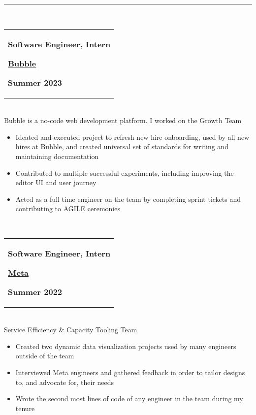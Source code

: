 \documentclass[10pt]{extarticle}
\begin{document}
\rule{\textwidth}{0.4pt}\\ 
\begin{tabular}{@{}p{\textwidth}}\begin{minipage}[t]{0.333\textwidth}
\raggedright
\textbf{Software Engineer, Intern}
\end{minipage}%
\begin{minipage}[t]{0.333\textwidth}
\centering
\textbf{\underline{Bubble}}
\end{minipage}%
\begin{minipage}[t]{0.333\textwidth}
\raggedleft
\textbf{Summer 2023}
\end{minipage}%
\end{tabular}\\[0.5ex]
Bubble is a no-code web development platform. I worked on the Growth Team\\ 
\vspace{-\baselineskip}
\begin{itemize}[noitemsep,nolistsep]
\item Ideated and executed project to refresh new hire onboarding, used by all new hires at Bubble, and created universal set of standards for writing and maintaining documentation
\item Contributed to multiple successful experiments, including improving the editor UI and user journey
\item Acted as a full time engineer on the team by completing sprint tickets and contributing to AGILE ceremonies
\end{itemize}~\\[-1ex]
\begin{tabular}{@{}p{\textwidth}}\begin{minipage}[t]{0.333\textwidth}
\raggedright
\textbf{Software Engineer, Intern}
\end{minipage}%
\begin{minipage}[t]{0.333\textwidth}
\centering
\textbf{\underline{Meta}}
\end{minipage}%
\begin{minipage}[t]{0.333\textwidth}
\raggedleft
\textbf{Summer 2022}
\end{minipage}%
\end{tabular}\\[0.5ex]
Service Efficiency \& Capacity Tooling Team\\ 
\vspace{-\baselineskip}
\begin{itemize}[noitemsep,nolistsep]
\item Created two dynamic data visualization projects used by many engineers outside of the team
\item Interviewed Meta engineers and gathered feedback in order to tailor designs to, and advocate for, their needs
\item Wrote the second most lines of code of any engineer in the team during my tenure
\end{itemize}~\\[-1ex]
\end{document}
